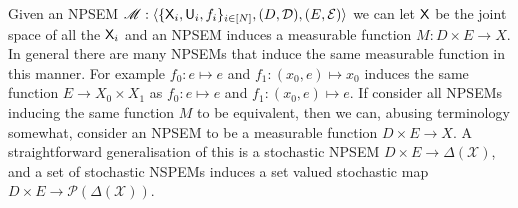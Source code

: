 Given an NPSEM $\mathscr{M}:\langle \{\mathsf{X}_i, \mathsf{U}_i, f_i\}_{i\in[N]}, (D,\mathcal{D}), (E,\mathcal{E})\rangle$ we can let $\mathsf{X}$ be the joint space of all the $\mathsf{X}_i$ and an NPSEM induces a measurable function $M:D\times E\to X$. In general there are many NPSEMs that induce the same measurable function in this manner. For example $f_0:e\mapsto e$ and $f_1:(x_0,e)\mapsto x_0$ induces the same function $E\to X_0\times X_1$ as $f_0:e\mapsto e$ and $f_1:(x_0,e)\mapsto e$. If consider all NPSEMs inducing the same function $M$ to be equivalent, then we can, abusing terminology somewhat, consider an NPSEM to be a measurable function $D\times E\to X$. A straightforward generalisation of this is a stochastic NPSEM $D\times E\to \Delta(\mathscr{X})$, and a set of stochastic NSPEMs induces a set valued stochastic map $D\times E\to \mathscr{P}(\Delta(\mathcal{X}))$.
